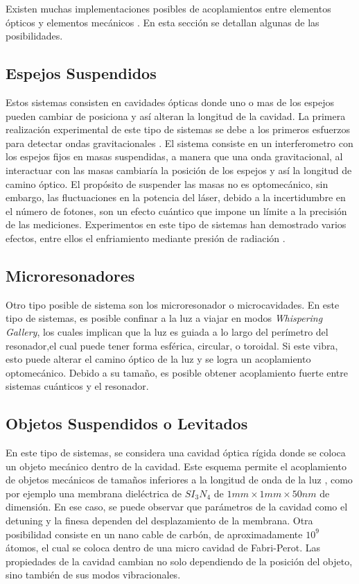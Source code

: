 \documentclass[a4paper,10pt]{report}
\begin{document}
Existen muchas implementaciones posibles de acoplamientos entre elementos ópticos y elementos mecánicos \cite{KippenberCO}. En esta sección se detallan algunas de las posibilidades.

\subsection{Espejos Suspendidos}

Estos sistemas consisten en cavidades ópticas donde uno o mas de los espejos pueden cambiar de posiciona y así alteran la longitud de la cavidad. La primera realización experimental de este tipo de sistemas se debe a los primeros esfuerzos para detectar ondas gravitacionales \cite{AbramoviciLIGO}. El sistema consiste en un interferometro con los espejos fijos en masas suspendidas, a manera que una onda gravitacional, al interactuar con las masas cambiaría la posición de los espejos y así la longitud de camino óptico. El propósito de suspender las masas no es optomecánico, sin embargo, las fluctuaciones en la potencia del láser, debido a la incertidumbre en el número de fotones, son un efecto cuántico que impone un límite a la precisión de las mediciones\cite{CavesIF}. Experimentos en este tipo de sistemas han demostrado varios efectos, entre ellos el enfriamiento mediante presión de radiación \cite{CorbittOC}.

\subsection{Microresonadores}

Otro tipo posible de sistema son los microresonador o microcavidades. En este tipo de sistemas, es posible confinar a la luz a viajar en modos \textit{Whispering Gallery}, los cuales implican que la luz es guiada a lo largo del perímetro del resonador,el cual puede tener forma esférica, circular, o toroidal\cite{VahalaOM}. Si este vibra, esto puede alterar el camino óptico de la luz y se logra un acoplamiento optomecánico. Debido a su tamaño, es posible obtener acoplamiento fuerte entre sistemas cuánticos y el resonador\cite{VerhagenMOC}.

\subsection{Objetos Suspendidos o Levitados}

En este tipo de sistemas, se considera una cavidad óptica rígida donde se coloca un objeto mecánico dentro de la cavidad. Este esquema permite el acoplamiento de objetos mecánicos de tamaños inferiores a la longitud de onda de la luz \cite{KippenberCO}, como por ejemplo una membrana dieléctrica de $SI_3N_4$ de  $1mm \times 1mm \times 50nm$
de dimensión\cite{SankeyMC}. En ese caso, se puede observar que parámetros de la cavidad como el detuning y la finesa dependen del desplazamiento de la membrana. Otra posibilidad consiste en un nano cable de carbón, de aproximadamente $10^9$ átomos, el cual se coloca dentro de una micro cavidad de Fabri-Perot. Las propiedades de la cavidad cambian no solo dependiendo de la posición del objeto, sino también de sus modos vibracionales\cite{FaveroCR}.  
\end{document}
